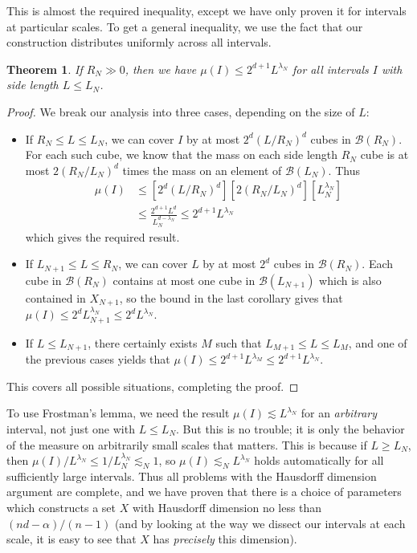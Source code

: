 \documentclass{article}
\theoremstyle{plain}
\theoremstyle{plain}
\newtheorem{theorem}{Theorem}
\begin{document}
\begin{multicols}{2}
This is almost the required inequality, except we have only proven it for intervals at particular scales. To get a general inequality, we use the fact that our construction distributes uniformly across all intervals.

\begin{theorem}
	If $R_N \gg 0$, then we have $\mu(I) \leq 2^{d+1} L^{\lambda_N}$ for all intervals $I$ with side length $L \leq L_N$.
\end{theorem}
\begin{proof}
	We break our analysis into three cases, depending on the size of $L$:
	\begin{itemize}
		\item If $R_N \leq L \leq L_N$, we can cover $I$ by at most $2^d(L/R_N)^d$ cubes in $\mathcal{B}(R_N)$. For each such cube, we know that the mass on each side length $R_N$ cube is at most $2(R_N/L_N)^d$ times the mass on an element of $\mathcal{B}(L_N)$. Thus
		\begin{align*}
			\mu(I) &\leq [2^d(L/R_N)^d] [2(R_N/L_N)^d] [L_N^{\lambda_N}]\\
			&\leq \frac{2^{d+1} L^d}{L_N^{d - \lambda_N}} \leq 2^{d+1} L^{\lambda_N}
		\end{align*}
		which gives the required result.

		\item If $L_{N+1} \leq L \leq R_N$, we can cover $L$ by at most $2^d$ cubes in $\mathcal{B}(R_N)$. Each cube in $\mathcal{B}(R_N)$ contains at most one cube in $\mathcal{B}(L_{N+1})$ which is also contained in $X_{N+1}$, so the bound in the last corollary gives that $\mu(I) \leq 2^d L_{N+1}^{\lambda_N} \leq 2^d L^{\lambda_N}$.

		\item If $L \leq L_{N+1}$, there certainly exists $M$ such that $L_{M+1} \leq L \leq L_M$, and one of the previous cases yields that $\mu(I) \leq 2^{d+1} L^{\lambda_M} \leq 2^{d+1} L^{\lambda_N}$.
	\end{itemize}
	This covers all possible situations, completing the proof.
\end{proof}

To use Frostman's lemma, we need the result $\mu(I) \lesssim L^{\lambda_N}$ for an {\it arbitrary} interval, not just one with $L \leq L_N$. But this is no trouble; it is only the behavior of the measure on arbitrarily small scales that matters. This is because if $L \geq L_N$, then $\mu(I)/L^{\lambda_N} \leq 1/L_N^{\lambda_N} \lesssim_N 1$, so $\mu(I) \lesssim_N L^{\lambda_N}$ holds automatically for all sufficiently large intervals. Thus all problems with the Hausdorff dimension argument are complete, and we have proven that there is a choice of parameters which constructs a set $X$ with Hausdorff dimension no less than $(nd - \alpha)/(n-1)$ (and by looking at the way we dissect our intervals at each scale, it is easy to see that $X$ has {\it precisely} this dimension).


\end{multicols}
\end{document}
